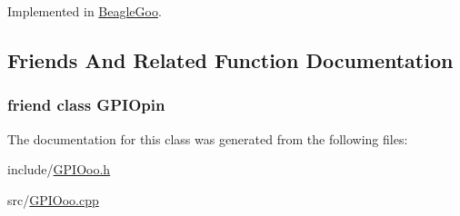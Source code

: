 Implemented in \hyperlink{struct_beagle_goo_a67436fe547740cf9ff11f5942175b2fc}{Beagle\-Goo}.



\subsection{Friends And Related Function Documentation}
\hypertarget{class_g_p_i_ooo_a266ea875ace024757dd1209ea5c0a327}{
\subsubsection[{G\-P\-I\-Opin}]{\setlength{\rightskip}{0pt plus 5cm}friend class {\bf G\-P\-I\-Opin}\hspace{0.3cm}{\ttfamily [friend]}}}\label{class_g_p_i_ooo_a266ea875ace024757dd1209ea5c0a327}


The documentation for this class was generated from the following files\-:\begin{DoxyCompactItemize}
\item 
include/\hyperlink{_g_p_i_ooo_8h}{G\-P\-I\-Ooo.\-h}\item 
src/\hyperlink{_g_p_i_ooo_8cpp}{G\-P\-I\-Ooo.\-cpp}\end{DoxyCompactItemize}

